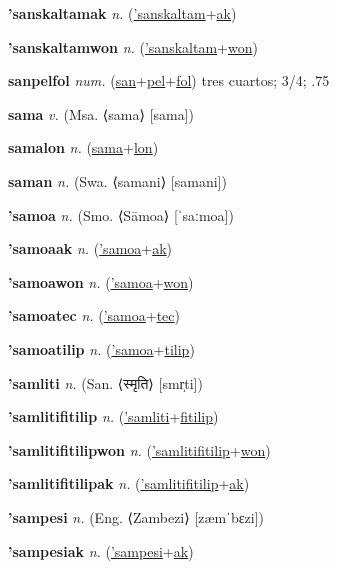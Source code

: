 \textbf{\hypertarget{'sanskaltamak}{'sanskaltamak}} \textit{n.} (\hyperlink{'sanskaltam}{'sanskaltam}+\allowbreak \hyperlink{ak}{ak})


\textbf{\hypertarget{'sanskaltamwon}{'sanskaltamwon}} \textit{n.} (\hyperlink{'sanskaltam}{'sanskaltam}+\allowbreak \hyperlink{won}{won})


\textbf{\hypertarget{sanpelfol}{sanpelfol}} \textit{num.} (\hyperlink{san}{san}+\allowbreak \hyperlink{pel}{pel}+\allowbreak \hyperlink{fol}{fol})
tres cuartos; 3/4; .75

\textbf{\hypertarget{sama}{sama}} \textit{v.} (Msa. ⟨sama⟩ [sama])


\textbf{\hypertarget{samalon}{samalon}} \textit{n.} (\hyperlink{sama}{sama}+\allowbreak \hyperlink{lon}{lon})


\textbf{\hypertarget{saman}{saman}} \textit{n.} (Swa. ⟨samani⟩ [samani])


\textbf{\hypertarget{'samoa}{'samoa}} \textit{n.} (Smo. ⟨Sāmoa⟩ [ˈsaːmoa])


\textbf{\hypertarget{'samoaak}{'samoaak}} \textit{n.} (\hyperlink{'samoa}{'samoa}+\allowbreak \hyperlink{ak}{ak})


\textbf{\hypertarget{'samoawon}{'samoawon}} \textit{n.} (\hyperlink{'samoa}{'samoa}+\allowbreak \hyperlink{won}{won})


\textbf{\hypertarget{'samoatec}{'samoatec}} \textit{n.} (\hyperlink{'samoa}{'samoa}+\allowbreak \hyperlink{tec}{tec})


\textbf{\hypertarget{'samoatilip}{'samoatilip}} \textit{n.} (\hyperlink{'samoa}{'samoa}+\allowbreak \hyperlink{tilip}{tilip})


\textbf{\hypertarget{'samliti}{'samliti}} \textit{n.} (San. ⟨{\devanagari{}स्मृति}⟩ [smr̩ti])


\textbf{\hypertarget{'samlitifitilip}{'samlitifitilip}} \textit{n.} (\hyperlink{'samliti}{'samliti}+\allowbreak \hyperlink{fitilip}{fitilip})


\textbf{\hypertarget{'samlitifitilipwon}{'samlitifitilipwon}} \textit{n.} (\hyperlink{'samlitifitilip}{'samlitifitilip}+\allowbreak \hyperlink{won}{won})


\textbf{\hypertarget{'samlitifitilipak}{'samlitifitilipak}} \textit{n.} (\hyperlink{'samlitifitilip}{'samlitifitilip}+\allowbreak \hyperlink{ak}{ak})


\textbf{\hypertarget{'sampesi}{'sampesi}} \textit{n.} (Eng. ⟨Zambezi⟩ [zæmˈbɛzi])


\textbf{\hypertarget{'sampesiak}{'sampesiak}} \textit{n.} (\hyperlink{'sampesi}{'sampesi}+\allowbreak \hyperlink{ak}{ak})


